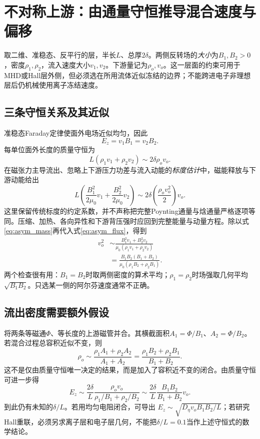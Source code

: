\documentclass[UTF8,a4paper,11pt,openany,fontset=fandol]{ctexbook}
\begin{document}
\section{不对称上游：由通量守恒推导混合速度与偏移}
取二维、准稳态、反平行的层，半长$L$、总厚$2\delta$。两侧反转场的\emph{大小}为$B_1,B_2>0$，密度$\rho_1,\rho_2$，流入速度大小$v_1,v_2$。下游量记为$\rho_o,v_o$。这一层面的约束可用于MHD或Hall层外侧，但必须选在所用流体近似冻结的边界；不能跨进电子非理想层后仍机械使用离子冻结速度。\citep{Cassak2007,Cassak2008}

\subsection{三条守恒关系及其近似}
准稳态Faraday定律使面外电场近似均匀，因此
\begin{equation}
 E_z=v_1B_1=v_2B_2.
 \label{eq:asym_flux}
\end{equation}
每单位面外长度的质量守恒为
\begin{equation}
 L(\rho_1v_1+\rho_2v_2)\sim2\delta\rho_o v_o.
 \label{eq:asym_mass}
\end{equation}
在磁张力主导流出、忽略上下游压力功差与流入动能的\emph{标度估计}中，磁能释放与下游动能给出
\begin{equation}
 L\left(\frac{B_1^2}{2\mu_0}v_1+\frac{B_2^2}{2\mu_0}v_2\right)
 \sim2\delta\left(\frac{\rho_o v_o^2}{2}\right)v_o.
\end{equation}
这里保留传统标度的约定系数，并不声称把完整Poynting通量与焓通量严格逐项等同。压缩、加热、各向异性和下游背压强时应回到完整能量与动量方程。除以式\eqref{eq:asym_mass}再代入式\eqref{eq:asym_flux}，得到
\begin{align}
 v_o^2&\sim\frac{B_1^2v_1+B_2^2v_2}
 {\mu_0(\rho_1v_1+\rho_2v_2)}\nonumber\\
 &=\boxed{\frac{B_1B_2(B_1+B_2)}{\mu_0(\rho_1B_2+\rho_2B_1)}}.
\end{align}
两个检查很有用：$B_1=B_2$时取两侧密度的算术平均；$\rho_1=\rho_2$时场强取几何平均$\sqrt{B_1B_2}$。只选某一侧的阿尔芬速度通常不正确。

\subsection{流出密度需要额外假设}
将两条等磁通$\Phi$、等长度的上游磁管并合。其横截面积$A_1=\Phi/B_1$、$A_2=\Phi/B_2$。若混合过程总容积近似不变，则
\begin{equation}
 \rho_o\sim\frac{\rho_1A_1+\rho_2A_2}{A_1+A_2}
 =\frac{\rho_1B_2+\rho_2B_1}{B_1+B_2}.
\end{equation}
这不是仅由质量守恒唯一决定的结果，而是加入了容积近不变的闭合。由质量守恒可进一步得
\begin{equation}
 E_z\sim\frac{2\delta}{L}
 \frac{\rho_o v_o}{\rho_1/B_1+\rho_2/B_2}
 \sim\frac{2\delta}{L}\frac{B_1B_2}{B_1+B_2}v_o.
\end{equation}
到此仍有未知的$\delta/L$。若用均匀电阻闭合，可导出
$E_z\sim\sqrt{D_\eta v_o B_1B_2/L}$；若研究Hall重联，必须另求离子层和电子层几何，不能把$\delta/L=0.1$当作上述守恒式的数学结论。
\end{document}
